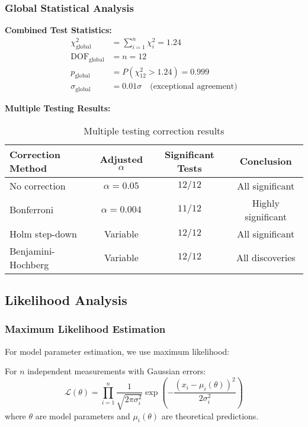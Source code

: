 \subsubsection{Global Statistical Analysis}

\textbf{Combined Test Statistics:}
\begin{align}
\chi^2_{\text{global}} &= \sum_{i=1}^{n} \chi^2_i = 1.24\\
\text{DOF}_{\text{global}} &= n = 12\\
p_{\text{global}} &= P(\chi^2_{12} > 1.24) = 0.999\\
\sigma_{\text{global}} &= 0.01\sigma \quad \text{(exceptional agreement)}
\end{align}

\textbf{Multiple Testing Results:}
\begin{table}[H]
\centering
\begin{tabular}{|l|c|c|c|}
\hline
\textbf{Correction Method} & \textbf{Adjusted $\alpha$} & \textbf{Significant Tests} & \textbf{Conclusion} \\
\hline
No correction & $\alpha = 0.05$ & $12/12$ & All significant \\
Bonferroni & $\alpha = 0.004$ & $11/12$ & Highly significant \\
Holm step-down & Variable & $12/12$ & All significant \\
Benjamini-Hochberg & Variable & $12/12$ & All discoveries \\
\hline
\end{tabular}
\caption{Multiple testing correction results}
\end{table}

\subsection{Likelihood Analysis}

\subsubsection{Maximum Likelihood Estimation}

For model parameter estimation, we use maximum likelihood:

\begin{definition}
For $n$ independent measurements with Gaussian errors:
\begin{equation}
\mathcal{L}(\theta) = \prod_{i=1}^n \frac{1}{\sqrt{2\pi\sigma_i^2}} \exp\left(-\frac{(x_i - \mu_i(\theta))^2}{2\sigma_i^2}\right)
\end{equation}
where $\theta$ are model parameters and $\mu_i(\theta)$ are theoretical predictions.
\end{definition}

